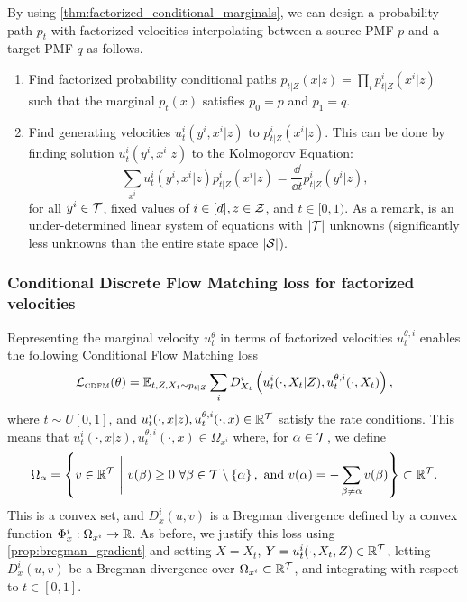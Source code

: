 \documentclass{fairmeta}
\renewcommand{\eqref}[1]{\labelcref{#1}}
\numberwithin{equation}{section}
\begin{document}
By using \cref{thm:factorized_conditional_marginals}, we can design a probability path $p_t$ with factorized velocities interpolating between a source PMF $p$ and a target PMF $q$ as follows.
\begin{enumerate}%
    \item Find factorized probability conditional paths $p_{t|Z}(x|z)=\prod_i p^i_{t|Z}(x^i|z)$ such that the marginal $p_t(x)$ satisfies $p_0=p$ and $p_1=q$.

    \item Find generating velocities $u_t^i(y^i,x^i|z)$ to $p^i_{t|Z}(x^i|z)$. This can be done by finding solution $u_t^i(y^i,x^i|z)$ to the Kolmogorov Equation:
\begin{equation}\label{e:dfm_factorized_continuity}
    \sum_{x^i} {u_t^i(y^i,x^i|z)}p^i_{t|Z}(x^i|z) = \frac{\dd}{\dd t}p^i_{t|Z}(y^i|z), %
\end{equation}
for all $y^i\in{\mathcal{T}}$, fixed values of $i\in[d], z\in{\mathcal{Z}}$, and $t\in[0,1)$.
As a remark, \eqref{e:dfm_factorized_continuity} is an under-determined linear system of equations with $|{\mathcal{T}}|$ unknowns (significantly less unknowns than the entire state space $|{\mathcal{S}}|$). 
\end{enumerate}




\subsubsection{Conditional Discrete Flow Matching loss for factorized velocities}\label{s:conditional_loss_for_factorized_discrete}

Representing the marginal velocity $u_t^\theta$ in terms of factorized velocities $u_t^{\theta,i}$ enables the following Conditional Flow Matching loss
\begin{equation}\label{e:cdfm_factorized}
    {\mathcal{L}}_{\scriptscriptstyle \text{CDFM}}(\theta) = \mathbb{E}_{t,Z,X_t\sim p_{t|Z}} \sum_i D^i_{X_t}\left ( u_t^i(\cdot,X_t|Z), u_t^{\theta,i}(\cdot,X_t) \right ),
\end{equation}
where $t\sim U[0,1]$, and $u^i_t(\cdot,x|z),u_t^{\theta,i}(\cdot,x)\in \mathbb R^{{\mathcal{T}}}$ satisfy the rate conditions.
This means that $u^i_t(\cdot,x|z),u_t^{\theta,i}(\cdot,x) \in \Omega_{x^i}$ where, for $\alpha\in {\mathcal{T}}$, we define 
\begin{equation}
    \Omega_{\alpha} = \set{ v\in \Real^{\gT} \ \Bigg\vert \  v(\beta)\geq 0\ \forall  \beta \in \gT\setminus\set{\alpha},  \text{ and } v(\alpha)=-\sum_{\beta\ne \alpha} v(\beta) }\subset \Real^\gT.
\end{equation}
This is a convex set, and $D^i_x(u,v)$ is a Bregman divergence defined by a convex function $\Phi^i_x:\Omega_{x^i} \rightarrow \mathbb R$.
As before, we justify this loss using \cref{prop:bregman_gradient} and setting $X=X_t$, $Y=u_t^i(\cdot,X_t,Z)\in \mathbb R^{\mathcal{T}}$, letting $D_x^i(u,v)$ be a Bregman divergence over $\Omega_{x^i}\subset \mathbb R^{\mathcal{T}}$, and integrating with respect to $t\in [0,1]$. %
\end{document}

